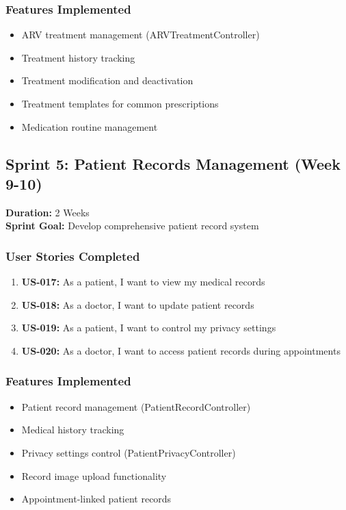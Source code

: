 \documentclass[12pt,a4paper]{article}
\begin{document}
\subsubsection{Features Implemented}
\begin{itemize}
    \item ARV treatment management (ARVTreatmentController)
    \item Treatment history tracking
    \item Treatment modification and deactivation
    \item Treatment templates for common prescriptions
    \item Medication routine management
\end{itemize}

\subsection{Sprint 5: Patient Records Management (Week 9-10)}
\textbf{Duration:} 2 Weeks \\
\textbf{Sprint Goal:} Develop comprehensive patient record system

\subsubsection{User Stories Completed}
\begin{enumerate}
    \item \textbf{US-017:} As a patient, I want to view my medical records
    \item \textbf{US-018:} As a doctor, I want to update patient records
    \item \textbf{US-019:} As a patient, I want to control my privacy settings
    \item \textbf{US-020:} As a doctor, I want to access patient records during appointments
\end{enumerate}

\subsubsection{Features Implemented}
\begin{itemize}
    \item Patient record management (PatientRecordController)
    \item Medical history tracking
    \item Privacy settings control (PatientPrivacyController)
    \item Record image upload functionality
    \item Appointment-linked patient records
\end{itemize}
\end{document}
